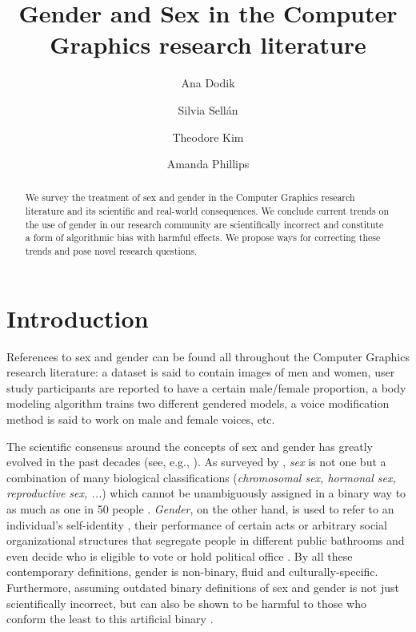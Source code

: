 \documentclass[nonacm,sigconf,review,balance=false]{acmart}
\begin{document}
\title{Gender and Sex in the Computer Graphics research literature}

\author{Ana Dodik}

\author{Silvia Sellán}\authornotemark[1]


\author{Theodore Kim}

\author{Amanda Phillips}


\begin{abstract}
    We survey the treatment of sex and gender in the Computer Graphics research
    literature and its scientific and real-world consequences. We conclude
    current trends on the use of gender in our research community are scientifically incorrect and constitute a
    form of algorithmic bias with harmful effects. We propose ways for
    correcting these trends and pose novel research questions.
\end{abstract}


\maketitle


\section{Introduction}

References to sex and gender can be found all throughout the Computer Graphics research literature: a dataset is said to contain images of men and women, user study participants are reported to have a certain male/female proportion, a body modeling algorithm trains two different gendered models, a voice modification method is said to work on male and female voices, etc. 

The scientific consensus around the concepts of sex and gender has greatly evolved in the past decades (see, e.g., \cite{pmid30377332}). As surveyed by \citet{fausto2012sex}, \emph{sex} is not one but a combination of many biological classifications (\emph{chromosomal sex, hormonal sex, reproductive sex, ...}) which cannot be unambiguously assigned in a binary way to as much as one in 50 people \cite{blackless2000sexually}. 
\emph{Gender}, on the other hand, is used to refer to an individual's self-identity \cite{money1972man}, their performance of certain acts \cite{butler2003gender} or arbitrary social organizational structures that segregate people in different public bathrooms and even decide who is eligible to vote or hold political office \cite{lorber1994paradoxes}. By all these contemporary definitions, gender is non-binary, fluid and culturally-specific. Furthermore, assuming outdated binary definitions of sex and gender is not just scientifically incorrect, but can also be shown to be harmful to those who conform the least to this artificial binary \cite{un2015report}.
\end{document}
